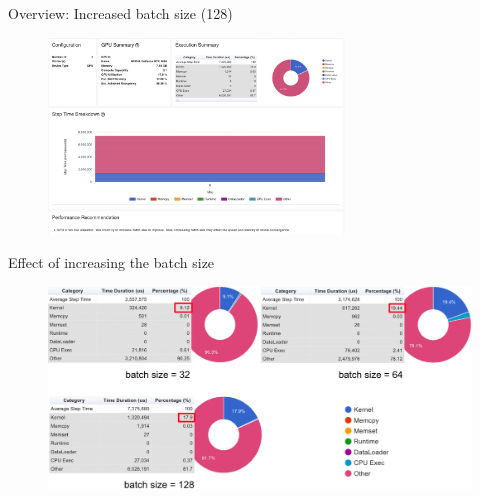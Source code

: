 \documentclass[compress,aspectratio=169]{beamer}
\begin{document}
\begin{frame}{Overview: Increased batch size (128)}
	\vspace{-1em}
\begin{center}
    \begin{figure}
        \includegraphics[width=0.7\textwidth]{../../data/scap_gtx1080_profiler-torch_batch-size-128_14650759}
    \end{figure}
    \end{center}

\end{frame}


\begin{frame}{Effect of increasing the batch size}
    \vspace{-0.5em}
\begin{center}
    \begin{figure}
        \includegraphics[width=1\textwidth]{../../data/scap_gtx1080_profiler-torch_comparison-batch-size}
    \end{figure}
    \end{center}

\end{frame}
\end{document}
